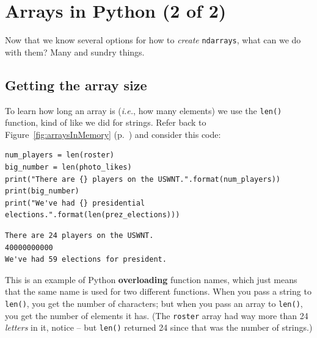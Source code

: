 


\chapter{Arrays in Python (2 of 2)}
\label{ch:arraysInPython2}


Now that we know several options for how to \textit{create} \texttt{ndarrays},
what can we do with them? Many and sundry things.

\section{Getting the array size}

To learn how long an array is (\textit{i.e.}, how many elements) we use the
\texttt{len()} function, kind of like we did for strings. Refer back to
Figure~\ref{fig:arraysInMemory} (p.~\pageref{fig:arraysInMemory}) and consider
this code:

\begin{Verbatim}[fontsize=\small,samepage=true,frame=single,framesep=3mm]
num_players = len(roster)
big_number = len(photo_likes)
print("There are {} players on the USWNT.".format(num_players))
print(big_number)
print("We've had {} presidential elections.".format(len(prez_elections)))
\end{Verbatim}

\begin{Verbatim}[fontsize=\small,samepage=true,frame=single,framesep=3mm]
There are 24 players on the USWNT.
40000000000
We've had 59 elections for president.
\end{Verbatim}

This is an example of Python \textbf{overloading} function names, which just
means that the same name is used for two different functions. When you pass a
string to \texttt{len()}, you get the number of characters; but when you pass
an array to \texttt{len()}, you get the number of elements it has.
(The \texttt{roster} array had way more than 24 \textit{letters} in it, notice
-- but \texttt{len()} returned 24 since that was the number of strings.)

